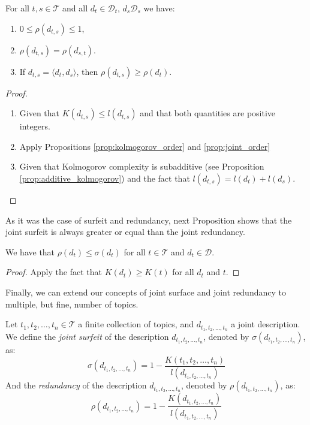 \begin{proposition}

For all $t, s \in \mathcal{T}$ and all $d_t \in \mathcal{D}_t$, $d_s \mathcal{D}_s$ we have:

\renewcommand{\theenumi}{\roman{enumi}}
\begin{enumerate}
\item $0 \leq \rho(d_{t,s}) \leq 1$,
\item $\rho(d_{t,s}) = \rho(d_{s,t})$.
\item If $d_{t,s} = \langle d_t, d_s \rangle$, then $\rho(d_{t,s}) \geq \rho(d_t)$.
\end{enumerate}
\end{proposition}
\begin{proof}

\renewcommand{\theenumi}{\roman{enumi}}
\begin{enumerate}

\item Given that $K(d_{t,s}) \leq l(d_{t,s})$ and that both quantities are positive integers.

\item Apply Propositions \ref{prop:kolmogorov_order} and \ref{prop:joint_order}

\item Given that Kolmogorov complexity is subadditive (see Proposition \ref{prop:additive_kolmogorov}) and the fact that $l(d_{t,s}) = l(d_t) + l(d_s)$.

\end{enumerate}
\end{proof}

As it was the case of surfeit and redundancy, next Proposition shows that the joint surfeit is always greater or equal than the joint redundancy.

\begin{proposition}
We have that $\rho(d_t) \leq \sigma(d_t)$ for all $t \in \mathcal{T}$ and $d_t \in \mathcal{D}$.
\end{proposition}
\begin{proof}
Apply the fact that $K(d_t) \geq K(t)$ for all $d_t$ and $t$.
\end{proof}

Finally, we can extend our concepts of joint surface and joint redundancy to multiple, but fine, number of topics.

\begin{definition}
Let $t_1, t_2, \ldots, t_n \in \mathcal{T}$ a finite collection of topics, and $d_{t_1, t_2, \ldots, t_n}$ a joint description. We define the \emph{joint surfeit} of the description $d_{t_1, t_2, \ldots, t_n}$, denoted by $\sigma(d_{t_1, t_2, \ldots, t_n})$, as: 
\[
\sigma(d_{t_1, t_2, \ldots, t_n}) = 1 - \frac{K(t_1, t_2, \ldots, t_n)}{l \left( d_{t_1, t_2, \ldots, t_n} \right)}
\]
And the \emph{redundancy} of the description $d_{t_1, t_2, \ldots, t_n}$, denoted by $\rho(d_{t_1, t_2, \ldots, t_n})$, as:
\[
\rho(d_{t_1, t_2, \ldots, t_n}) = 1 - \frac{K(d_{t_1, t_2, \ldots, t_n})}{l \left( d_{t_1, t_2, \ldots, t_n} \right)}
\]
\end{definition}

